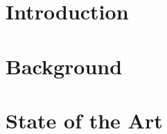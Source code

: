 \documentclass[english, a4paper, 12pt, twoside]{article}
\numberwithin{equation}{section} %
\def\biblio{\clearpage} %
\begin{document}
\def\biblio{} %


\restoregeometry %

\thispagestyle{plain} %
\clearpage\mbox{}\clearpage %

%     

\newpage


\newpage
\tableofcontents

\newpage
{ 
\listoffigures}
 
\newpage
{ 
\listoftables}

\newpage
{} %
\setcounter{page}{1} %


\section{Introduction} %
\clearpage %

\section{Background}
    
\clearpage

\section{State of the Art}
    
\clearpage

%     
\end{document}
